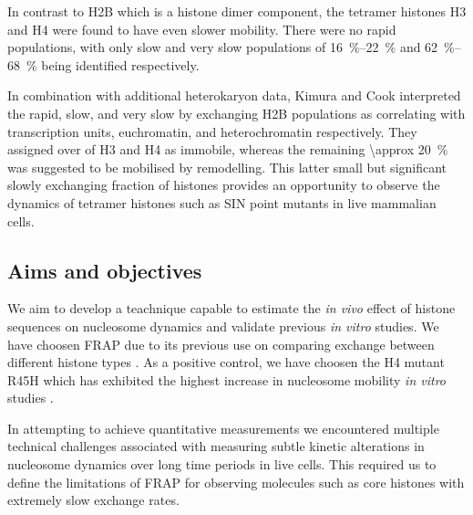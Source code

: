     In contrast to H2B which is a histone dimer component, the tetramer
    histones H3 and H4 were found to have even slower mobility.  There
    were no rapid populations, with only slow and very slow populations
    of \SIrange{16}{22}{\percent} and \SIrange{62}{68}{\percent} being
    identified respectively.

    In combination with additional heterokaryon data, Kimura and Cook
    interpreted the rapid, slow, and very slow by exchanging H2B
    populations as correlating with transcription units, euchromatin,
    and heterochromatin respectively.  They assigned over 
    of H3 and H4 as immobile, whereas the remaining
    \SI{\approx 20}{\percent} was suggested to be mobilised by
    remodelling.  This latter small but significant
    slowly exchanging fraction of histones
    provides an opportunity to observe the dynamics of
    tetramer histones such as SIN point mutants in live mammalian cells.


  \subsection{Aims and objectives}

    We aim to develop a teachnique capable to estimate the \textit{in
      vivo} effect of histone sequences on nucleosome dynamics and
    validate previous \textit{in vitro} studies.  We have choosen FRAP
    due to its previous use on comparing exchange between different
    histone types \citep{KimuraCook}.  As a positive control, we have
    choosen the H4 mutant R45H which has exhibited the highest
    increase in nucleosome mobility \textit{in vitro} studies
    \citep{flaus2004sin}.

    In attempting to achieve quantitative measurements
    we encountered multiple technical challenges associated with
    measuring subtle kinetic alterations in nucleosome dynamics
    over long time periods in live cells.
    This required us to define the limitations of FRAP for observing molecules
    such as core histones with extremely slow exchange rates.
